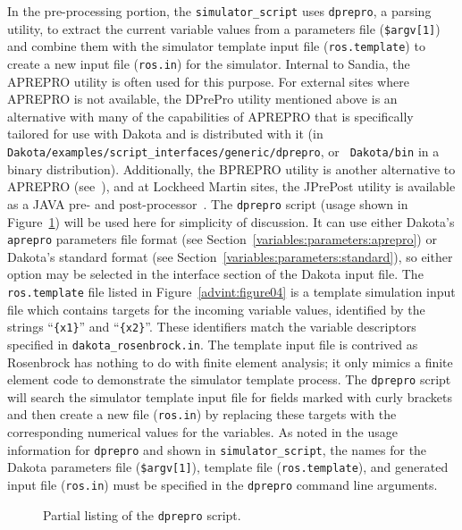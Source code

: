 In the pre-processing portion, the \texttt{simulator\_script} uses
\texttt{dprepro}, a parsing utility, to extract the
current variable values from a parameters file (\texttt{\$argv[1]})
and combine them with the simulator template input file
(\texttt{ros.template}) to create a new input file (\texttt{ros.in})
for the simulator. Internal to Sandia, the APREPRO utility is often
used for this purpose. For external sites where APREPRO is not
available, the DPrePro utility mentioned above is an alternative with
many of the capabilities of APREPRO that is specifically tailored for
use with Dakota and is distributed with it (in
\\ \texttt{Dakota/examples/script\_interfaces/generic/dprepro}, or {\tt
Dakota/bin} in a binary distribution). Additionally, the BPREPRO
utility is another alternative to APREPRO (see~\cite{WalXX}), and at
Lockheed Martin sites, the JPrePost utility is available as a JAVA
pre- and post-processor~\cite{Fla}. The \texttt{dprepro} script
(usage shown in Figure~\ref{advint:figure03}) will be used here for
simplicity of discussion. It can use either Dakota's \texttt{aprepro}
parameters file format (see
Section~\ref{variables:parameters:aprepro}) or Dakota's standard
format (see Section~\ref{variables:parameters:standard}), so either
option may be selected in the interface section of the Dakota input
file. The \texttt{ros.template} file listed in
Figure~\ref{advint:figure04} is a template simulation input file which
contains targets for the incoming variable values, identified by the
strings ``\texttt{\{x1\}}'' and ``\texttt{\{x2\}}''. These
identifiers match the variable descriptors specified in
\texttt{dakota\_rosenbrock.in}. The template input file is contrived
as Rosenbrock has nothing to do with finite element analysis; it only
mimics a finite element code to demonstrate the simulator
template process. The \texttt{dprepro} script will search the
simulator template input file for fields marked with curly
brackets and then create a new file (\texttt{ros.in}) by replacing
these targets with the corresponding numerical values for the
variables. As noted in the usage information for \texttt{dprepro} and
shown in \texttt{simulator\_script}, the names for the Dakota
parameters file (\texttt{\$argv[1]}), template file
(\texttt{ros.template}), and generated input file (\texttt{ros.in})
must be specified in the \texttt{dprepro} command line arguments.

\begin{figure}
  \centering
  \begin{bigbox}
    \begin{small}
    \end{small}
  \end{bigbox}
  \caption{Partial listing of the \texttt{dprepro} script.}
  \label{advint:figure03}
\end{figure}

